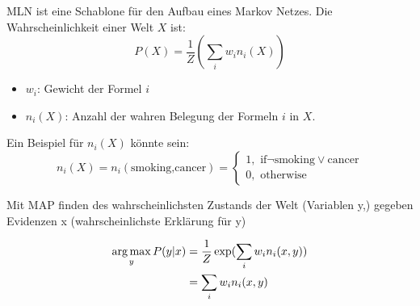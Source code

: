 MLN ist eine Schablone für den Aufbau eines Markov Netzes. Die Wahrscheinlichkeit
einer Welt $X$ ist:
\begin{displaymath}
    P(X) = \frac{1}{Z}(\sum_{i}w_in_i(X))
\end{displaymath}
\begin{itemize}
    \item $w_i$: Gewicht der Formel $i$
    \item $n_i(X)$: Anzahl der wahren Belegung der Formeln $i$ in $X$.
\end{itemize}
Ein Beispiel für $n_i(X)$ könnte sein:
\begin{displaymath}
    n_i(X) = n_i(\text{smoking,cancer}) = \begin{cases}
                                                1, \text{ if} \neg\text{smoking}
                                                 \vee \text{cancer}\\
                                                0, \text{ otherwise}
                                        \end{cases}
\end{displaymath}

Mit MAP finden des wahrscheinlichsten Zustands der Welt (Variablen y,) gegeben Evidenzen
x (wahrscheinlichste Erklärung für y)

\begin{align}
    \operatorname*{arg\,max}_y P(y | x) &= \frac{1}{Z} \exp(\sum_{i} w_i n_i(x, y))\\
         &= \sum_{i} w_i n_i(x, y)
     \end{align}
